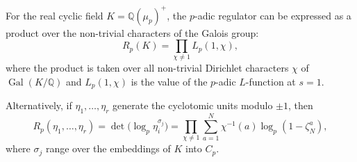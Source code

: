 For the real cyclic field $K = \mathbb{Q}(\mu_p)^+$, the $p$-adic regulator can be expressed as a product over the non-trivial characters of the Galois group:
$$
R_p(K) = \prod_{\chi \neq 1} L_p(1, \chi),
$$
where the product is taken over all non-trivial Dirichlet characters $\chi$ of $\operatorname{Gal}(K/\mathbb{Q})$ and $L_p(1,\chi)$ is the value of the $p$-adic $L$-function at $s=1$.

Alternatively, if $\eta_1, \dots, \eta_r$ generate the cyclotomic units modulo $\pm 1$, then
$$
R_p(\eta_1, \dots, \eta_r) = \det\!\bigl( \log_p \eta_i^{\sigma_j} \bigr) = \prod_{\chi \neq 1} \sum_{a=1}^{N} \chi^{-1}(a) \log_p(1 - \zeta_N^a),
$$
where $\sigma_j$ range over the embeddings of $K$ into $C_p$.
